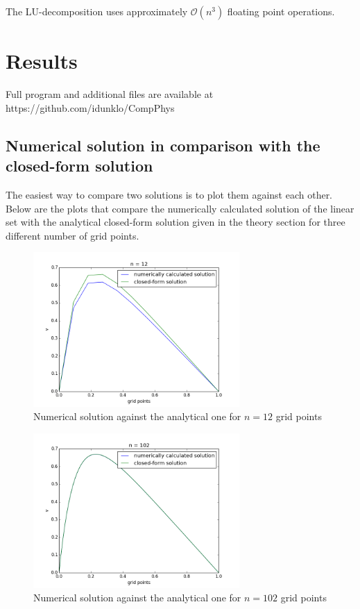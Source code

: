 \documentclass[a4paper,norsk,12pt,oneside]{article}
\begin{document}
The LU-decomposition uses approximately \(\mathcal{O}(n^3)\) floating point operations. 

\section{Results}

Full program and additional files are available at https://github.com/idunklo/CompPhys

\subsection{Numerical solution in comparison with the closed-form solution}\label{subsec:resplot}

The easiest way to compare two solutions is to plot them against each other. 
Below are the plots that compare the numerically calculated solution of the
linear set with the
analytical closed-form solution given in the theory section for three different number of grid points. 

\begin{figure}[H]
        \centering %
        \includegraphics[width=0.7\textwidth]{blabla_12.png}
        \caption{Numerical solution against the analytical one for \(n = 12\) grid points} 
    \end{figure}

\begin{figure}[H]
            \centering %
            \includegraphics[width=0.7\textwidth]{blabla_102.png}
            \caption{Numerical solution against the analytical one for \(n = 102\) grid points} 
            \end{figure}   
\end{document}
